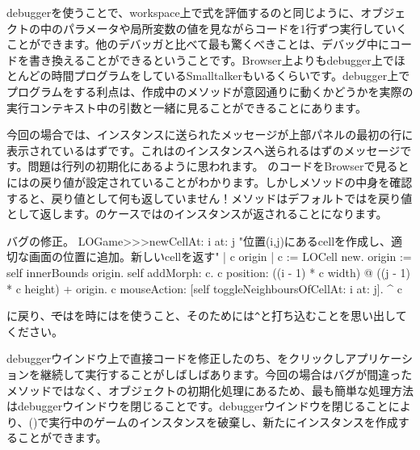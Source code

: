 \documentclass[a4paper,10pt,twoside]{book}
\begin{document}
debuggerを使うことで、workspace上で式を評価するのと同じように、オブジェクトの中のパラメータや局所変数の値を見ながらコードを1行ずつ実行していくことができます。他のデバッガと比べて最も驚くべきことは、デバッグ中にコードを書き換えることができるということです。Browser上よりもdebugger上でほとんどの時間プログラムをしているSmalltalkerもいるくらいです。debugger上でプログラムをする利点は、作成中のメソッドが意図通りに動くかどうかを実際の実行コンテキスト中の引数と一緒に見ることができることにあります。

今回の場合では、インスタンスに送られたメッセージが上部パネルの最初の行に表示されているはずです。これはのインスタンスへ送られるはずのメッセージです。問題は行列の初期化にあるように思われます。
のコードをBrowserで見るとにはの戻り値が設定されていることがわかります。しかしメソッドの中身を確認すると、戻り値として何も返していません！メソッドはデフォルトではを戻り値として返します。のケースではのインスタンスが返されることになります。

\dothis{debuggerウインドウを閉じで下さい。
その後、\ct{c}を返すために``\ct{^ c}''式を \ct{LOGame>>>newCellAt:at:}メソッドの最後に追加して下さい。
(\mthref{newCellAt:at:nobug}参照。)}

\begin{method}{バグの修正。}
LOGame>>>newCellAt: i at: j
   "位置(i,j)にあるcellを作成し、適切な画面の位置に追加。新しいcellを返す"
   | c origin |
   c := LOCell new.
   origin := self innerBounds origin.
   self addMorph: c.
   c position: ((i - 1) * c width) @ ((j - 1) * c height) + origin.
   c mouseAction: [self toggleNeighboursOfCellAt: i at: j].
   ^ c
\end{method}

\noindent
{}に戻り、\st ではを時には\ct{^}を使うこと、そのためには\verb|^|と打ち込むことを思い出してください。

debuggerウインドウ上で直接コードを修正したのち、をクリックしアプリケーションを継続して実行することがしばしばあります。今回の場合はバグが間違ったメソッドではなく、オブジェクトの初期化処理にあるため、最も簡単な処理方法はdebuggerウインドウを閉じることです。debuggerウインドウを閉じることにより、()で実行中のゲームのインスタンスを破棄し、新たにインスタンスを作成することができます。
\end{document}
